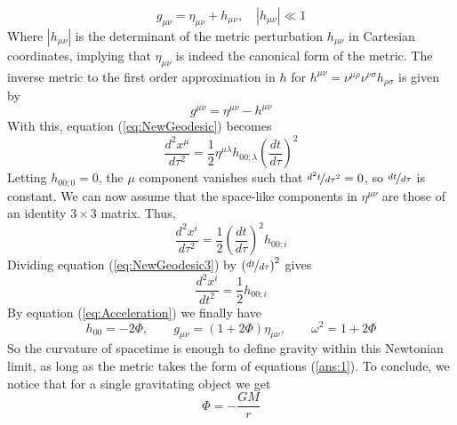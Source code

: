 \documentclass{article}
\begin{document}
	$$ g_{\mu\nu} = \eta_{\mu\nu} + h_{\mu\nu}, \quad |h_{\mu\nu}| \ll 1$$
	Where $|h_{\mu\nu}|$ is the determinant of the metric perturbation $h_{\mu\nu}$ in Cartesian coordinates, implying that $\eta_{\mu\nu}$ is indeed the canonical form of the metric. The inverse metric to the first order approximation in $h$ for $h^{\mu\nu} = \nu^{\mu\rho}\nu^{\nu\sigma}h_{\rho\sigma}$ is given by 
	$$ g^{\mu\nu} = \eta^{\mu\nu} - h^{\mu\nu}$$
	With this, equation (\ref{eq:NewGeodesic}) becomes
	\begin{equation}
		\label{eq:NewGeodesic2}
		\frac{d^2 x^\mu}{d\tau^2} =\frac{1}{2} \eta^{\mu\lambda}h_{00;\lambda}  \left( \frac{dt }{d\tau}\right)^2 
	\end{equation}
	Letting $h_{00;0}=0$, the $\mu$ component vanishes such that $\nicefrac{d^2t }{d\tau^2} = 0$, so $\nicefrac{dt }{d\tau}$ is constant. 
	We can now assume that the space-like components in $\eta^{\mu\nu}$ are those of an identity $3\times 3$ matrix. Thus,
	\begin{equation}
		\label{eq:NewGeodesic3}
		\frac{d^2 x^i}{d\tau^2} =\frac{1}{2}   \left( \frac{dt }{d\tau}\right)^2 h_{00;i}
	\end{equation}
	Dividing equation (\ref{eq:NewGeodesic3}) by $\left(\nicefrac{dt }{d\tau}\right)^2$ gives 
	\begin{equation}
		\label{eq:NewGeodesic4}
		\frac{d^2 x^i}{dt^2} =\frac{1}{2} h_{00;i}
	\end{equation}
	By equation (\ref{eq:Acceleration}) we finally have
	\begin{equation}
		\label{ans:1}
		\boxed{h_{00} = -2\Phi, \quad\quad g_{\mu\nu}=(1+2\Phi)\eta_{\mu\nu}, \quad\quad \omega^2 = 1+2\Phi}
	\end{equation}
	So the curvature of spacetime is enough to define gravity within this Newtonian limit, as long as the metric takes the form of equations (\ref{ans:1}). To conclude, we notice that for a single gravitating object we get
	\begin{equation}
		\label{ans:2}
		\boxed{\Phi = - \frac{GM}{r}}
	\end{equation}
	
	\pagebreak
\end{document}
